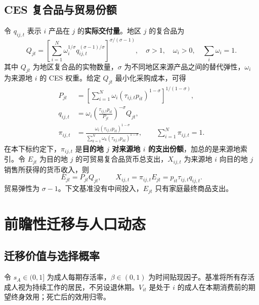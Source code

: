 \documentclass[UTF8,a4paper,zihao=-4,fontset=windows]{ctexart}
\numberwithin{equation}{section}
\begin{document}
\subsection{CES 复合品与贸易份额}
令 $q_{ij,t}$ 表示 $i$ 产品在 $j$ 的\textbf{实际交付量}。地区 $j$ 的复合品为
\begin{equation}
  Q_{jt}=\left[\sum_{i=1}^N\omega_i^{1/\sigma}
       q_{ij,t}^{(\sigma-1)/\sigma}\right]^{\sigma/(\sigma-1)},
  \quad \sigma>1,\quad \omega_i>0,\quad\sum_i\omega_i=1.
  \label{eq:ces}
\end{equation}
其中 $Q_{jt}$ 为地区复合品的实物数量，$\sigma$ 为不同地区来源产品之间的替代弹性，$\omega_i$ 为来源地 $i$ 的 CES 权重。给定 $Q_{jt}$ 最小化采购成本，可得
\begin{align}
  P_{jt}&=\left[\sum_{i=1}^N\omega_i
           (\tau_{ij,t}p_{it})^{1-\sigma}\right]^{1/(1-\sigma)},
           \label{eq:price-index}\\
  q_{ij,t}&=\omega_i\left(\frac{\tau_{ij,t}p_{it}}{P_{jt}}\right)^{-\sigma}Q_{jt},
           \label{eq:bilateral-quantity}\\
  \pi_{ij,t}&=\frac{\omega_i(\tau_{ij,t}p_{it})^{1-\sigma}}
       {\sum_{k=1}^N\omega_k(\tau_{kj,t}p_{kt})^{1-\sigma}},
  \qquad\sum_{i=1}^N\pi_{ij,t}=1.
  \label{eq:trade-share}
\end{align}
在本下标约定下，$\pi_{ij,t}$ 是\textbf{目的地 $j$ 对来源地 $i$ 的支出份额}，加总的是来源地索引。令 $E_{jt}$ 为目的地 $j$ 的可贸易复合品货币总支出，$X_{ij,t}$ 为来源地 $i$ 向目的地 $j$ 销售所获得的货币收入，则
\begin{equation}
  E_{jt}=P_{jt}Q_{jt},\qquad
  X_{ij,t}=\pi_{ij,t}E_{jt}=p_{it}\tau_{ij,t}q_{ij,t}.
  \label{eq:trade-values}
\end{equation}
贸易弹性为 $\sigma-1$。下文基准没有中间投入，$E_{jt}$ 只有家庭最终商品支出。

\section{前瞻性迁移与人口动态}
\label{sec:migration-demography}

\subsection{迁移价值与选择概率}
令 $s_A\in(0,1]$ 为成人每期存活率，$\beta\in(0,1)$ 为时间贴现因子。基准将所有存活成人视为持续工作的居民，不另设退休期。$V_{it}$ 是处于 $i$ 的成人在本期消费前的期望终身效用；死亡后的效用归零。
\end{document}
